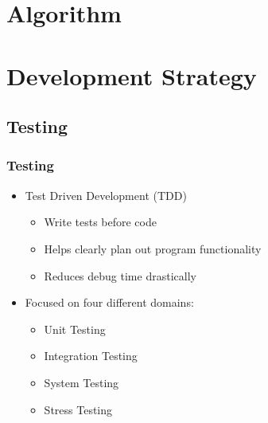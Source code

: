 \documentclass{beamer}
\begin{document}
\section{Algorithm}


\section{Development Strategy}
\subsection{Testing}
\begin{frame}
\frametitle{Testing}
\begin{itemize}
\item Test Driven Development (TDD)
\begin{itemize}
\item Write tests before code
\item Helps clearly plan out program functionality
\item Reduces debug time drastically
\end{itemize}
\item Focused on four different domains:
\begin{itemize}
\item Unit Testing
\item Integration Testing 
\item System Testing
\item Stress Testing 
\end{itemize}
\end{itemize}
\end{frame}


\end{document}
